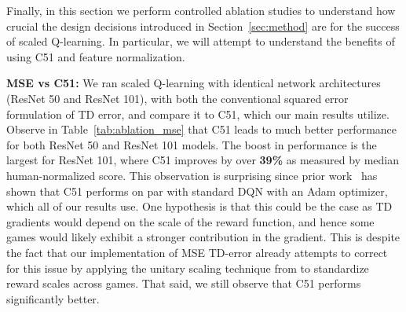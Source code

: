 Finally, in this section we perform controlled ablation studies to understand how crucial the design decisions introduced in Section~\ref{sec:method} are for the success of scaled Q-learning. In particular, we will attempt to understand the benefits of using C51 and feature normalization.

\textbf{MSE vs C51:} We ran scaled Q-learning with identical network architectures (ResNet 50 and ResNet 101), with both the conventional squared error formulation of TD error, and compare it to C51, which our main results utilize. Observe in Table~\ref{tab:ablation_mse} that C51 leads to much better performance for both ResNet 50 and ResNet 101 models. The boost in performance is the largest for ResNet 101, where C51 improves by over \textbf{39\%} as measured by median human-normalized score. This observation is surprising since prior work~\citep{agarwal2021deep} has shown that C51 performs on par with standard DQN with an Adam optimizer, which all of our results use. One hypothesis is that this could be the case as TD gradients would depend on the scale of the reward function, and hence some games would likely exhibit a stronger contribution in the gradient. This is despite the fact that our implementation of MSE TD-error already attempts to correct for this issue by applying the unitary scaling technique from \citep{kurin2022defense} to standardize reward scales across games. That said, we still observe that C51 performs significantly better.

\begin{table}[t]
    \centering
    \centering
    \vspace{-0.3cm}
    \caption{\footnotesize{\textbf{Performance of Scaled QL with the standard mean-squared TD-error and C51} in the offline 40-game setting aggregated by the median human-normalized score. Observe that for both ResNet 50 and ResNet 101, utilizing C51 leads to a drastic improvement in performance.}}%
    \label{tab:ablation_mse}
    \vspace{0.1cm}
\end{table}


